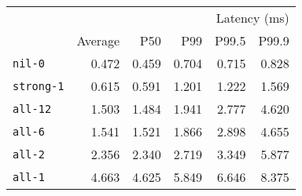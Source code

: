\begin{tabular}{lrrrrr}
\toprule
 & \multicolumn{5}{r}{Latency (ms)}\\
 & Average & P50 & P99 & P99.5 & P99.9 \\
\midrule
\texttt{nil-0} & 0.472 & 0.459 & 0.704 & 0.715 & 0.828\\
\texttt{strong-1} & 0.615 & 0.591 & 1.201 & 1.222 & 1.569\\
\texttt{all-12} & 1.503 & 1.484 & 1.941 & 2.777 & 4.620\\
\texttt{all-6} & 1.541 & 1.521 & 1.866 & 2.898 & 4.655\\
\texttt{all-2} & 2.356 & 2.340 & 2.719 & 3.349 & 5.877\\
\texttt{all-1} & 4.663 & 4.625 & 5.849 & 6.646 & 8.375\\
\bottomrule
\end{tabular}